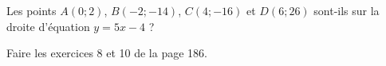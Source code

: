 
\begin{exercice}\label{exosmath-0613}

    Les points \( A(0;2)\), \( B(-2;-14)\), \( C(4;-16)\) et \( D(6;26)\) sont-ils sur la droite d'équation \( y=5x-4\) ?

    Faire les exercices 8 et 10 de la page 186.

\end{exercice}
